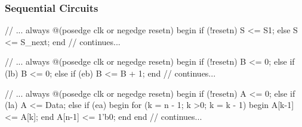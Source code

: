 \documentclass[12pt,openany]{book}
\begin{document}
\subsubsection{Sequential Circuits}
\begin{minipage}[htp]{0.45\textwidth}
\begin{vhdl}
// ...
always @(posedge clk or negedge resetn) begin
	if (!resetn) S <= S1;
	else S <= S_next;
	end
// continues...
\end{vhdl}
\vspace*{40px}
\begin{vhdl}
// ...
always @(posedge clk or negedge resetn) begin
	if (!resetn) B <= 0;
	else if (lb) B <= 0;
	else if (eb) B <= B + 1;
end
// continues...
\end{vhdl}
\vspace*{50px}
\begin{vhdl}
	// ...
	always @(posedge clk or negedge resetn) begin
		if (!resetn) A <= 0;
		else if (la) A <= Data;
		else if (ea) begin
			for (k = n - 1; k >0; k = k - 1) begin
				A[k-1] <= A[k];
			end
			A[n-1] <= 1'b0;
		end
	end
	// continues...
	\end{vhdl}
\end{minipage}
\hfill\vline
\hfill
\end{document}
